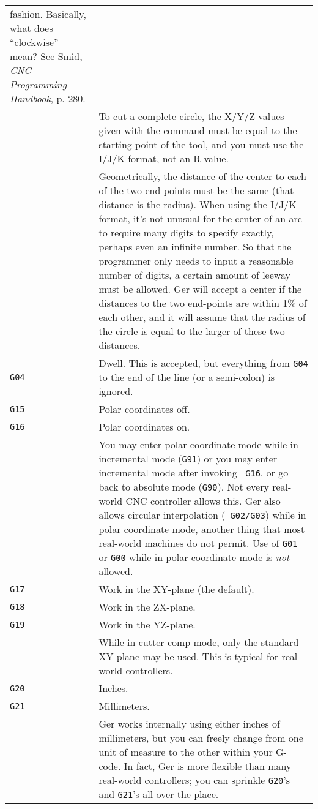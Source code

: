 \documentclass[titlepage,oneside,10pt]{article}
\begin{document}
\begin{longtable}{lp{10cm}}
fashion. Basically, what does ``clockwise'' mean? See Smid, \emph{CNC
  Programming Handbook}, p. 280.\\
&To cut a complete circle, the X/Y/Z values given with the command
must be equal to the starting point of the tool, and you must use
the I/J/K format, not an R-value.\\
&Geometrically, the distance of the center to each of the two
end-points must be the same (that distance is the radius). When using
the I/J/K format, it's not unusual for the center of an arc to require
many digits to specify exactly, perhaps even an infinite number. So
that the programmer only needs to input a reasonable number of digits,
a certain amount of leeway must be allowed. Ger will accept a center
if the distances to the two end-points are within 1\% of each other,
and it will assume that the radius of the circle is equal to the
larger of these two distances.\\
{\tt G04}&Dwell. This is accepted, but everything from {\tt G04} to
the end of the line (or a semi-colon) is ignored.\\
{\tt G15}&Polar coordinates off.\\
{\tt G16}&Polar coordinates on. \\
&You may enter polar coordinate mode while in incremental mode
({\tt G91}) or you may enter incremental mode after invoking {\tt
  G16}, or go back to absolute mode ({\tt G90}). Not every real-world CNC
controller allows this. Ger also allows circular interpolation ({\tt
  G02/G03}) while in polar coordinate mode, another thing that most
real-world machines do not permit. Use of {\tt G01} or {\tt G00} while
in polar coordinate mode is \emph{not} allowed.\\ 
{\tt G17}& Work in the XY-plane (the default).\\
{\tt G18}& Work in the ZX-plane.\\
{\tt G19}& Work in the YZ-plane.\\
& While in cutter comp mode, only the standard XY-plane may be
used. This is typical for real-world controllers.\\
{\tt G20}&Inches.\\
{\tt G21}&Millimeters.\\
& Ger works internally using either inches of millimeters, but you can
freely change from one unit of measure to the other within your
G-code. In fact, Ger is more flexible than many real-world
controllers; you can sprinkle {\tt G20}'s and {\tt G21}'s all over the
place.\\  

\end{longtable}
\end{document}
